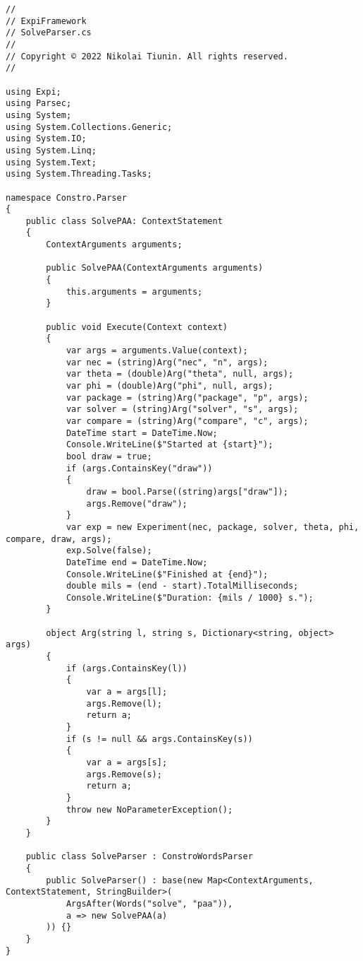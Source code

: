 \documentclass{scrartcl}
\begin{document}
\begin{lstlisting}[language={[Sharp]C}, caption={Solve}, label={experiment}]
//
// ExpiFramework
// SolveParser.cs
//
// Copyright © 2022 Nikolai Tiunin. All rights reserved.
//

using Expi;
using Parsec;
using System;
using System.Collections.Generic;
using System.IO;
using System.Linq;
using System.Text;
using System.Threading.Tasks;

namespace Constro.Parser
{
    public class SolvePAA: ContextStatement
    {
        ContextArguments arguments;

        public SolvePAA(ContextArguments arguments)
        {
            this.arguments = arguments;
        }

        public void Execute(Context context)
        {
            var args = arguments.Value(context);
            var nec = (string)Arg("nec", "n", args);
            var theta = (double)Arg("theta", null, args);
            var phi = (double)Arg("phi", null, args);
            var package = (string)Arg("package", "p", args);
            var solver = (string)Arg("solver", "s", args);
            var compare = (string)Arg("compare", "c", args);
            DateTime start = DateTime.Now;
            Console.WriteLine($"Started at {start}");
            bool draw = true;
            if (args.ContainsKey("draw"))
            {
                draw = bool.Parse((string)args["draw"]);
                args.Remove("draw");
            }
            var exp = new Experiment(nec, package, solver, theta, phi, compare, draw, args);
            exp.Solve(false);
            DateTime end = DateTime.Now;
            Console.WriteLine($"Finished at {end}");
            double mils = (end - start).TotalMilliseconds;
            Console.WriteLine($"Duration: {mils / 1000} s.");
        }

        object Arg(string l, string s, Dictionary<string, object> args)
        {
            if (args.ContainsKey(l))
            {
                var a = args[l];
                args.Remove(l);
                return a;
            }
            if (s != null && args.ContainsKey(s))
            {
                var a = args[s];
                args.Remove(s);
                return a;
            }
            throw new NoParameterException();
        }
    }

    public class SolveParser : ConstroWordsParser
    {
        public SolveParser() : base(new Map<ContextArguments, ContextStatement, StringBuilder>(
            ArgsAfter(Words("solve", "paa")),
            a => new SolvePAA(a)
        )) {}
    }
}


\end{lstlisting}
\end{document}
